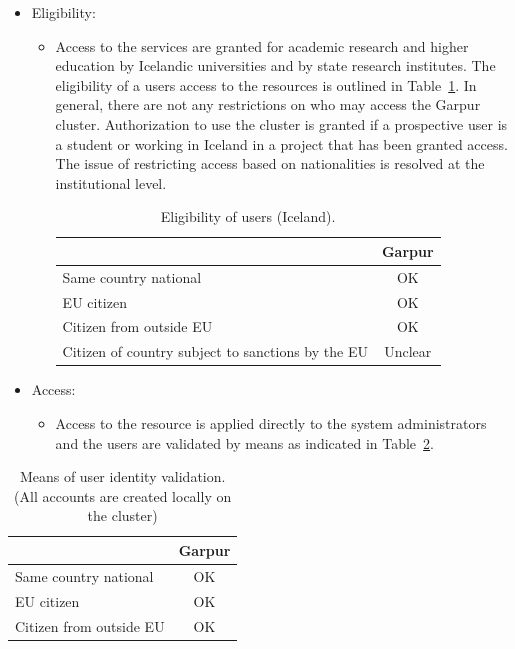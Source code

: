 \documentclass{article}
\begin{document}
\begin{itemize}
\item[]Eligibility:
\begin{itemize} 
\item[]
Access to the services are granted for academic research and higher education by Icelandic universities  and by state research institutes. The eligibility of a users access to the resources is outlined in Table~\ref{tab:IS_user_elegibility}.
In general, there are not any restrictions on who may access the Garpur cluster. 
Authorization to use the cluster is granted if a prospective user is a 
student or working in Iceland in a project that has been granted access.
The issue of restricting access based on nationalities is resolved at the institutional level.
\begin{table}[!h]
    \centering
    \begin{tabular}{|l|c|}
        \hline
    & Garpur  \\
    \hline
  Same country national      &  OK\\
    \hline
    EU citizen       &  OK\\
        \hline
        Citizen from outside EU	         &  OK\\
        \hline
        Citizen of country subject to sanctions by the EU  & Unclear \\
        \hline
        \end{tabular}
    \caption{Eligibility of users (Iceland).}
    \label{tab:IS_user_elegibility}
\end{table}
\end{itemize} 

\item[]Access:
\begin{itemize} 
\item[] Access to the resource is applied directly to the system administrators and the users are validated by means as indicated in Table~\ref{tab:IS_user_acc_val}.
\end{itemize} 
\end{itemize}
\begin{table}[!h]
    \centering
    \begin{tabular}{|l|c|}
        \hline
    & Garpur  \\
    \hline
  Same country national      &  OK\\
    \hline
    EU citizen       &  OK\\
        \hline
        Citizen from outside EU	         &  OK\\
        \hline
        \end{tabular}
    \caption{Means of user identity validation. (All accounts are created locally on the cluster)}
    \label{tab:IS_user_acc_val}
\end{table}
\end{document}
